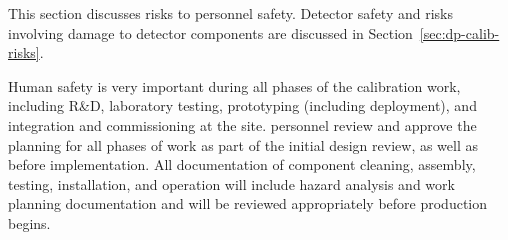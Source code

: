 
This section discusses risks to personnel safety. Detector safety and risks involving damage to detector components are discussed in Section~\ref{sec:dp-calib-risks}.

Human safety %
is very important during all phases of the calibration work, including R\&D, laboratory testing, prototyping (including  deployment), and integration and commissioning at the   site.   personnel review and approve the planning for all phases of work as part of the initial design review, as well as before implementation. All documentation of component cleaning, assembly, testing, installation, and operation will include hazard analysis and work planning documentation and will be reviewed appropriately before production begins.


